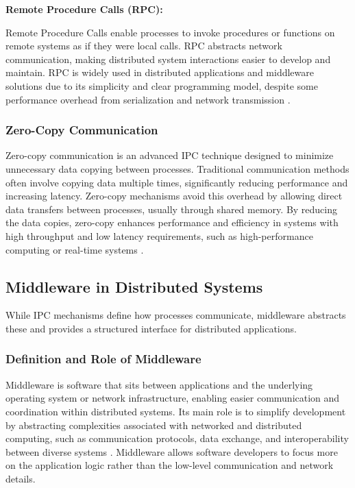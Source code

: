 \vspace{1em}
\newpage
\textbf{Remote Procedure Calls (RPC):}

\vspace{0.4em}
Remote Procedure Calls enable processes to invoke procedures or functions on remote systems as if they were local calls. RPC abstracts network communication, making distributed system interactions easier to develop and maintain. RPC is widely used in distributed applications and middleware solutions due to its simplicity and clear programming model, despite some performance overhead from serialization and network transmission \cite{coulouris2012}.

\subsubsection{Zero-Copy Communication}

Zero-copy communication is an advanced IPC technique designed to minimize unnecessary data copying between processes. Traditional communication methods often involve copying data multiple times, significantly reducing performance and increasing latency. Zero-copy mechanisms avoid this overhead by allowing direct data transfers between processes, usually through shared memory. By reducing the data copies, zero-copy enhances performance and efficiency in systems with high throughput and low latency requirements, such as high-performance computing or real-time systems \cite{raiciu2017}.



\subsection{Middleware in Distributed Systems}

While IPC mechanisms define how processes communicate, middleware abstracts these and provides a structured interface for distributed applications.

\subsubsection{Definition and Role of Middleware}

Middleware is software that sits between applications and the underlying operating system or network infrastructure, enabling easier communication and coordination within distributed systems. Its main role is to simplify development by abstracting complexities associated with networked and distributed computing, such as communication protocols, data exchange, and interoperability between diverse systems \cite{bernstein1996}. Middleware allows software developers to focus more on the application logic rather than the low-level communication and network details.


